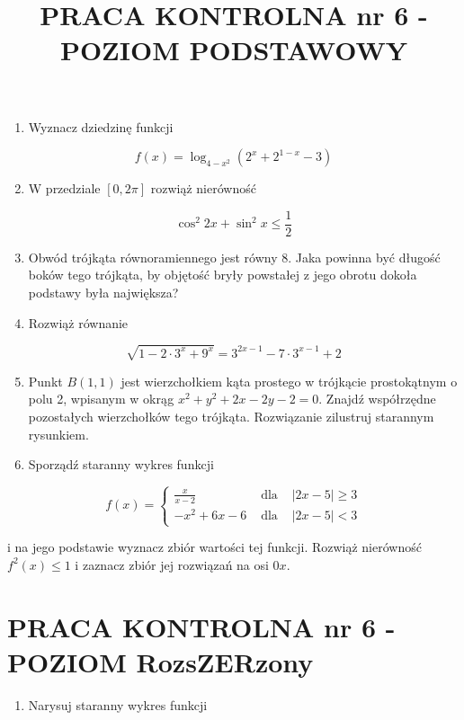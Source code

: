 \documentclass[10pt]{article}
\title{PRACA KONTROLNA nr 6 - POZIOM PODSTAWOWY }
\author{}
\date{}
\begin{document}
\maketitle
\begin{enumerate}
  \item Wyznacz dziedzinę funkcji
\end{enumerate}

$$
f(x)=\log _{4-x^{2}}\left(2^{x}+2^{1-x}-3\right)
$$

\begin{enumerate}
  \setcounter{enumi}{1}
  \item W przedziale $[0,2 \pi]$ rozwiąż nierówność
\end{enumerate}

$$
\cos ^{2} 2 x+\sin ^{2} x \leqslant \frac{1}{2}
$$

\begin{enumerate}
  \setcounter{enumi}{2}
  \item Obwód trójkąta równoramiennego jest równy 8. Jaka powinna być długość boków tego trójkąta, by objętość bryły powstałej z jego obrotu dokoła podstawy była największa?
  \item Rozwiąż równanie
\end{enumerate}

$$
\sqrt{1-2 \cdot 3^{x}+9^{x}}=3^{2 x-1}-7 \cdot 3^{x-1}+2
$$

\begin{enumerate}
  \setcounter{enumi}{4}
  \item Punkt $B(1,1)$ jest wierzchołkiem kąta prostego w trójkącie prostokątnym o polu 2, wpisanym w okrąg $x^{2}+y^{2}+2 x-2 y-2=0$. Znajdź współrzędne pozostałych wierzchołków tego trójkąta. Rozwiązanie zilustruj starannym rysunkiem.
  \item Sporządź staranny wykres funkcji
\end{enumerate}

$$
f(x)=\left\{\begin{array}{lll}
\frac{x}{x-2} & \text { dla } & |2 x-5| \geqslant 3 \\
-x^{2}+6 x-6 & \text { dla } & |2 x-5|<3
\end{array}\right.
$$

i na jego podstawie wyznacz zbiór wartości tej funkcji. Rozwiąż nierówność $f^{2}(x) \leqslant 1$ i zaznacz zbiór jej rozwiązań na osi $0 x$.

\section*{PRACA KONTROLNA nr 6 - POZIOM RozsZERzony}
\begin{enumerate}
  \item Narysuj staranny wykres funkcji
\end{enumerate}
\end{document}
